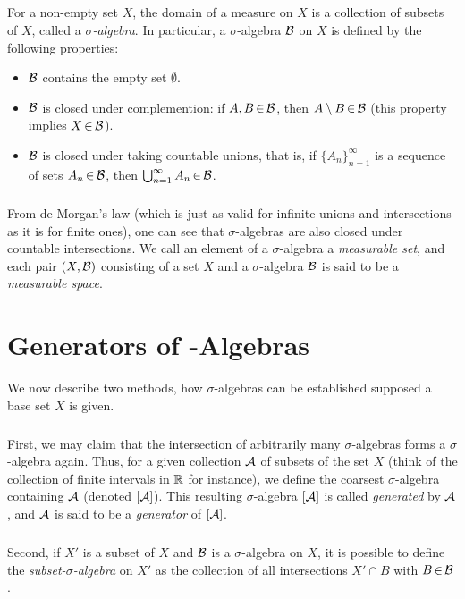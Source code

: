 \documentclass[11pt,twoside]{article}
\begin{document}
\subparagraph{}
For a non-empty set $X$,
the domain of a measure on $X$ is a collection of subsets of $X$,
called a \textit{$\sigma$-algebra}.
In particular,
a $\sigma$-algebra ${\mathcal{B}}$ on $X$ is defined by the following properties:

\begin{itemize}[leftmargin=22pt]
\item[1.]
${\mathcal{B}}$ contains the empty set $\emptyset$.

\item[2.]
${\mathcal{B}}$ is closed under complemention:
if $A,B {\,\in\,} {\mathcal{B}}$, then $A \setminus B {\,\in\,} {\mathcal{B}}$
(this property implies $X {\,\in\,} {\mathcal{B}}$).

\item[3.]
${\mathcal{B}}$ is closed under taking countable unions,
that is,
if $\{ {A_n}\}_{n=1}^{\infty}$ is a sequence of sets $A_n {\,\in\,} {\mathcal{B}}$,
then $\bigcup_{n=1}^{\infty} A_n {\,\in\,} {\mathcal{B}}$.
\end{itemize}

\subparagraph{}
From de Morgan's law
(which is just as valid for infinite unions and intersections
as it is for finite ones),
one can see
that $\sigma$-algebras are also closed under countable intersections.
We call an element of a $\sigma$-algebra a \textit{measurable set},
and each pair $(X,{\mathcal{B}})$ consisting of a set $X$ and
a $\sigma$-algebra ${\mathcal{B}}$ is said to be a \textit{measurable space}.

\section{Generators of \textsigma-Algebras}
We now describe two methods,
how $\sigma$-algebras can be established supposed a base set $X$ is given.

\subparagraph{}
First,
we may claim
that the intersection of arbitrarily many $\sigma$-algebras
forms a $\sigma$-algebra again.
Thus,
for a given collection $\mathcal{A}$ of subsets of the set $X$
(think of the collection of finite intervals in ${\mathbb{R}}$ for instance),
we define the {coarsest} $\sigma$-algebra containing $\mathcal{A}$
(denoted $[\mathcal{A}]$).
This resulting $\sigma$-algebra $[\mathcal{A}]$ is called
\textit{generated} by $\mathcal{A}$,
and $\mathcal{A}$ is said to be a \textit{generator} of $[\mathcal{A}]$.

\subparagraph{}
Second,
if $X'$ is a subset of $X$ and ${\mathcal{B}}$ is a $\sigma$-algebra on $X$,
it is possible to define the \textit{subset-$\sigma$-algebra} on $X'$
as the collection of all intersections $X' \cap B$ with $B {\,\in\,} {\mathcal{B}}$.
\end{document}
